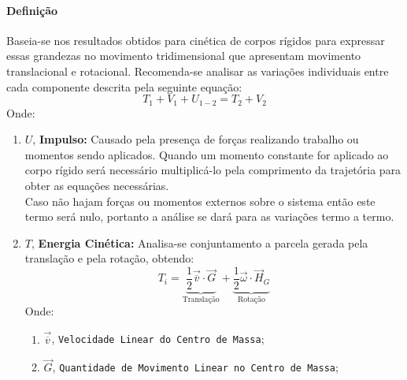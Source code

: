 \documentclass{article}
\begin{document}
            \paragraph{Definição}Baseia-se nos resultados obtidos para cinética de corpos rígidos para expressar essas grandezas no movimento tridimensional que apresentam movimento translacional e rotacional. Recomenda-se analisar as variações individuais entre cada componente descrita pela seguinte equação:
                \begin{equation}
                    \boxed{
                        T_{1} + V_{1} + U_{1-2} = T_{2} + V_{2}
                    }
                \end{equation}
            Onde:
                \begin{enumerate}[rightmargin = \leftmargin]
                    \item $U$, \textbf{Impulso:} Causado pela presença de forças realizando trabalho ou momentos sendo aplicados. Quando um momento constante for aplicado ao corpo rígido será necessário multiplicá-lo pela comprimento da trajetória para obter as equações necessárias.\\
                    Caso não hajam forças ou momentos externos sobre o sistema então este termo será nulo, portanto a análise se dará para as variações termo a termo.

                    \item $T$, \textbf{Energia Cinética:} Analisa-se conjuntamento a parcela gerada pela translação e pela rotação, obtendo:
                        \begin{equation}
                            \boxed{
                                T_{i} = 
                                \underbrace{
                                    \frac{1}{2} \vec{\overline{v}}\cdot\vec{G}
                                }_{\text{Translação}} + 
                                \underbrace{
                                    \frac{1}{2}\vec{\omega}\cdot\vec{H}_{G}
                                }_{\text{Rotação}}
                            }\label{eq.KyneticEnergy}
                        \end{equation}
                    Onde:
                        \begin{enumerate}[rightmargin = \leftmargin, noitemsep]
                            \item $\vec{\overline{v}}$, \texttt{Velocidade Linear do Centro de Massa};

                            \item $\vec{G}$, \texttt{Quantidade de Movimento Linear no Centro de Massa}; \vspace{5mm}


\end{enumerate}
\end{enumerate}
\end{document}
